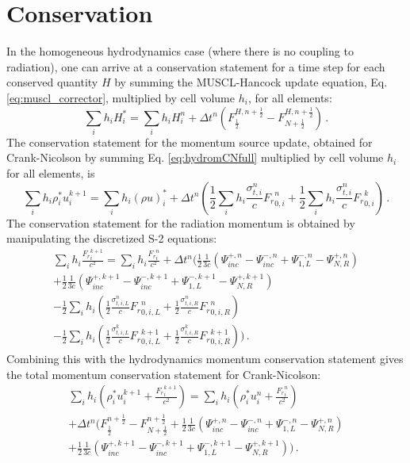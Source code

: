 \documentclass[preprint,12pt]{elsarticle}
\newcommand{\fn}[1]{\left( #1 \right)}
\newcommand{\pep}{\, .}
\newcommand{\half}{\frac{1}{2}}
\newcommand{\F}{{F_r}}
\newcommand{\dt}{\Delta t}
\begin{document}
\section{Conservation}
In the homogeneous hydrodynamics case (where there is no coupling to radiation),
one can arrive at a conservation statement for a time step for each conserved
quantity $H$ by summing the MUSCL-Hancock update equation, Eq.
\eqref{eq:muscl_corrector}, multiplied by cell volume $h_i$, for all elements:
\begin{equation}
   \sum\limits_i h_i H_i^* = \sum\limits_i h_i H_i^n
   + \Delta t^n\left(F_{\half}^{H,n+\half} - F_{N+\half}^{H,n+\half}\right) \pep
\end{equation}
The conservation statement for the momentum source update, obtained for
Crank-Nicolson by summing Eq. \eqref{eq:hydromCNfull} multiplied by cell
volume $h_i$ for all elements, is
\begin{equation}
   \sum\limits_i h_i \rho_i^* u_i^{k+1} = \sum\limits_i h_i (\rho u)_i^*
   +\dt^n\left(
   \half\sum\limits_i h_i \frac{\sigma_{t,i}^n}{c}\F_{0,i}^n
   + \half\sum\limits_i h_i \frac{\sigma_{t,i}^n}{c}\F_{0,i}^k
   \right) \pep
\end{equation}
The conservation statement for the radiation momentum is obtained by
manipulating the discretized S-2 equations:
\begin{multline}
   \sum\limits_i h_i \frac{\F_i^{k+1}}{c^2} = \sum\limits_i h_i \frac{\F_i^n}{c^2}
   + \dt^n\Bigg(
   \half\frac{1}{3c}\fn{\Psi^{+,n}_{inc} - \Psi^{-,n}_{inc}
   + \Psi^{-,n}_{1,L} - \Psi^{+,n}_{N,R}}\\
   + \half\frac{1}{3c}\fn{\Psi^{+,k+1}_{inc} - \Psi^{-,k+1}_{inc}
   + \Psi^{-,k+1}_{1,L} - \Psi^{+,k+1}_{N,R}}\\
   - \half\sum\limits_i h_i\fn{\half\frac{\sigma_{t,i,L}^n}{c}\F_{0,i,L}^n
   + \half\frac{\sigma_{t,i,R}^n}{c}\F_{0,i,R}^n}\\
   - \half\sum\limits_i h_i\fn{\half\frac{\sigma_{t,i,L}^k}{c}\F_{0,i,L}^{k+1}
   + \half\frac{\sigma_{t,i,R}^k}{c}\F_{0,i,R}^{k+1}}
   \Bigg) \pep
\end{multline}
Combining this with the hydrodynamics momentum conservation statement
gives the total momentum conservation statement for Crank-Nicolson:
\begin{multline}
   \sum\limits_i h_i\fn{\rho_i^* u_i^{k+1} + \frac{\F_i^{k+1}}{c^2}} =
   \sum\limits_i h_i\fn{\rho_i^* u_i^n + \frac{\F_i^n}{c^2}}\\
   + \dt^n\bigg(
   F_{\half}^{n+\half} - F_{N+\half}^{n+\half}
   + \half\frac{1}{3c}\fn{\Psi^{+,n}_{inc} - \Psi^{-,n}_{inc}
   + \Psi^{-,n}_{1,L} - \Psi^{+,n}_{N,R}}\\
   + \half\frac{1}{3c}\fn{\Psi^{+,k+1}_{inc} - \Psi^{-,k+1}_{inc}
   + \Psi^{-,k+1}_{1,L} - \Psi^{+,k+1}_{N,R}}
   \bigg) \pep
\end{multline}
\end{document}

